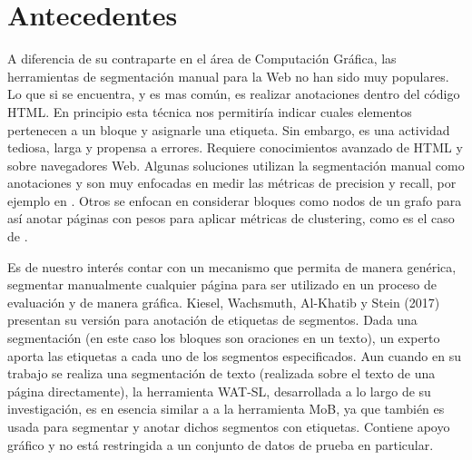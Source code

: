 \documentclass[10pt]{revecom}
\begin{document}
\section{Antecedentes}
\label{trabajos_referencia}


A diferencia de su contraparte en el área de Computación Gráfica, las herramientas de segmentación manual para la Web no han sido muy populares. Lo que si se encuentra, y es mas común, es realizar anotaciones dentro del código HTML. 
En principio esta técnica nos permitiría indicar cuales elementos pertenecen a un bloque y asignarle una etiqueta.
Sin embargo, es una actividad tediosa, larga y propensa a errores. Requiere conocimientos avanzado de HTML y sobre navegadores Web. 
Algunas soluciones utilizan la segmentación manual como anotaciones y son muy enfocadas en medir las
métricas de precision y recall, por ejemplo en \cite{liu2011segmenting, uzun2013hybrid}.
Otros se enfocan en considerar bloques como nodos de un grafo para así anotar páginas con pesos para aplicar métricas de clustering, como es el caso de \cite {Chakrabarti:WWW:2008,10.1145/3326457}. 

Es de nuestro interés contar con un mecanismo que permita de manera genérica, segmentar manualmente cualquier página para ser utilizado en un proceso de evaluación y de manera gráfica. Kiesel, Wachsmuth, Al-Khatib y Stein (2017)\cite{kiesel-etal-2017-wat} presentan su versión para anotación de etiquetas de segmentos. Dada una segmentación (en este caso los bloques son oraciones en un texto), un experto aporta las etiquetas a cada uno de los segmentos especificados.
%
Aun cuando en su trabajo se realiza una segmentación de texto (realizada sobre el texto de una página directamente), la herramienta WAT-SL, desarrollada a lo largo de su investigación, es en esencia similar a a la herramienta MoB, ya que también es usada para segmentar y anotar dichos segmentos con etiquetas.
Contiene apoyo gráfico y no está restringida a un conjunto de datos de prueba en particular.
\end{document}
